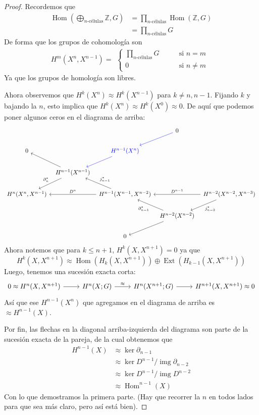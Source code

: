 \documentclass[spanish]{book}
\theoremstyle{definition}
\newcommand{\Z}{\mathbb{Z}}
\DeclareMathOperator{\img}{img}
\DeclareMathOperator{\Hom}{Hom}
\DeclareMathOperator{\Ext}{Ext}
\begin{document}
\begin{proof}
		 Recordemos que
	 \begin{align*}
	 	\Hom(\bigoplus_{n\text{-células}}\Z,G)&=\prod_{n\text{-células}}\Hom(\Z,G)\\
	 	&=\prod_{n\text{-células}}G
	 \end{align*}
	 De forma que los grupos de cohomología son
	 \[H^m(X^n,X^{n-1})=
	 \begin{aligned}
	 	\begin{cases}
	 	\prod_{n\text{-células}}G\qquad&\text{si }n=m\\
	 	0\qquad&\text{si }n\neq m
	 \end{cases}
	 \end{aligned}\]
	 Ya que los grupos de homología son libres.
	 
	 Ahora observemos que $H^k(X^n)\approx H^k(X^{n-1})$ para $k\neq n,n-1$. Fijando $k$ y bajando la $n$, esto implica que $H^k(X^n)\approx H^k(X^0)\approx0$. De aquí que podemos poner algunos ceros en el diagrama de arriba:
	\[\begin{tikzcd}[column sep=tiny]
		&&&0\arrow[ld,blue]\\
		0&&\textcolor{blue}{H^{n-1}(X^n)}\arrow[ld,blue]\\
		&H^{n-1}(X^{n-1})\arrow[lu]\arrow[ld,swap, "\partial^*_n"] \\
		H^n(X^n, X^{n-1})   && H^{n-1}(X^{n-1}, X^{n-2})\arrow[ll,swap, "D^n"]\arrow[lu,swap, "j^*_{n-1}"]  && H^{n-2}(X^{n-2}, X^{n-3})  \arrow[ld, "j^*_{n-2}"]\arrow[ll,swap, "D^{n-1}"] \\
		& && H^{n-2}(X^{n-2})\arrow[lu, "\partial^*_{n-1}"]\arrow[ld]\\
		&&0
	\end{tikzcd}\]
	Ahora notemos que para $k\leq n+1$, $H^k(X,X^{n+1})=0$ ya que
	\[H^k(X,X^{n+1})\approx\Hom(H_k(X,X^{n+1}))\oplus\Ext(H_{k-1}(X,X^{n+1}))\]
	Luego, tenemos una sucesión exacta corta:
	\[\begin{tikzcd}
		0\approx H^n(X,X^{n+1})\arrow[r]&H^n(X;G)\arrow[r,"\approx"]&H^n(X^{n+1};G)\arrow[r]&H^{n+1}(X,X^{n+1})\approx0
	\end{tikzcd}\]
	Así que ese $H^{n-1}(X^n)$ que agregamos en el diagrama de arriba es $\approx H^{n-1}(X)$.
	
	Por fin, las flechas en la diagonal arriba-izquierda del diagrama son parte de la sucesión exacta de la pareja, de la cual obtenemos que
	\begin{align*}
		H^{n-1}(X)&\approx\ker\partial_{n-1}\\
		&\approx\ker D^{n-1}/\img\partial_{n-2}\\
		&\approx\ker D^{n-1}/\img D^{n-2}\\
		&\approx\Hom^{n-1}(X)
	\end{align*}
	Con lo que demostramos la primera parte. (Hay que recorrer la $n$ en todos lados para que sea más claro, pero así está bien).
	

\end{proof}
\end{document}
